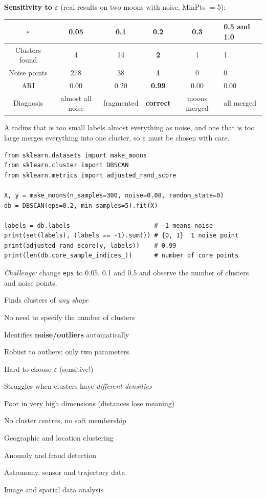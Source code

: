 \textbf{Sensitivity to $\varepsilon$} (real results on two moons with noise, MinPts $=5$):

\begin{center}
\begin{tabular}{@{}cccccl@{}}
\toprule
$\varepsilon$ & 0.05 & 0.1 & \textbf{0.2} & 0.3 & 0.5 and 1.0\\
\midrule
Clusters found & 4 & 14 & \textbf{2} & 1 & 1\\
Noise points & 278 & 38 & \textbf{1} & 0 & 0\\
ARI & 0.00 & 0.20 & \textbf{0.99} & 0.00 & 0.00\\
Diagnosis & almost all noise & fragmented & \textbf{correct} & moons merged & all merged\\
\bottomrule
\end{tabular}
\end{center}

\noindent A radius that is too small labels almost everything as noise, and one that is too large merges everything into one cluster, so $\varepsilon$ must be chosen with care.

\begin{tryit}
\begin{lstlisting}
from sklearn.datasets import make_moons
from sklearn.cluster import DBSCAN
from sklearn.metrics import adjusted_rand_score

X, y = make_moons(n_samples=300, noise=0.08, random_state=0)
db = DBSCAN(eps=0.2, min_samples=5).fit(X)

labels = db.labels_                      # -1 means noise
print(set(labels), (labels == -1).sum()) # {0, 1}  1 noise point
print(adjusted_rand_score(y, labels))    # 0.99
print(len(db.core_sample_indices_))      # number of core points
\end{lstlisting}
\emph{Challenge:} change \texttt{eps} to 0.05, 0.1 and 0.5 and observe the number of clusters and noise points.
\end{tryit}

{\item Finds clusters of \emph{any shape}
 \item No need to specify the number of clusters
 \item Identifies \textbf{noise/outliers} automatically
 \item Robust to outliers; only two parameters}
{\item Hard to choose $\varepsilon$ (sensitive!)
 \item Struggles when clusters have \emph{different densities}
 \item Poor in very high dimensions (distances lose meaning)
 \item No cluster centres, no soft membership}
{\item Geographic and location clustering
 \item Anomaly and fraud detection
 \item Astronomy, sensor and trajectory data
 \item Image and spatial data analysis}

